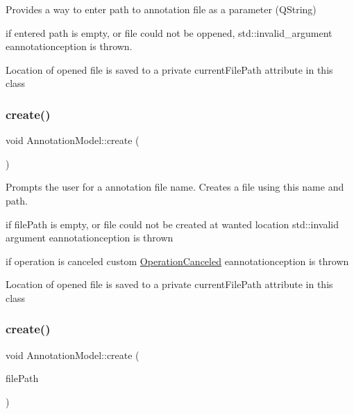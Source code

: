 Provides a way to enter path to annotation file as a parameter (Q\+String) 

if entered path is empty, or file could not be oppened, std\+::invalid\+\_\+argument eannotationception is thrown.

Location of opened file is saved to a private current\+File\+Path attribute in this class \mbox{\label{classAnnotationModel_ac4c6850c8d0f704c3bf5bef486992690}} 
\subsubsection{\texorpdfstring{create()}{create()}\hspace{0.1cm}{\footnotesize\ttfamily [1/2]}}
{\footnotesize\ttfamily void Annotation\+Model\+::create (\begin{DoxyParamCaption}{ }\end{DoxyParamCaption})}



Prompts the user for a annotation file name. Creates a file using this name and path. 

if file\+Path is empty, or file could not be created at wanted location std\+::invalid argument eannotationception is thrown

if operation is canceled custom \hyperlink{classOperationCanceled}{Operation\+Canceled} eannotationception is thrown

Location of opened file is saved to a private current\+File\+Path attribute in this class \mbox{\label{classAnnotationModel_ac5062c8663670a312132929f16e4be64}} 
\subsubsection{\texorpdfstring{create()}{create()}\hspace{0.1cm}{\footnotesize\ttfamily [2/2]}}
{\footnotesize\ttfamily void Annotation\+Model\+::create (\begin{DoxyParamCaption}\item[{const Q\+String \&}]{file\+Path }\end{DoxyParamCaption})}



